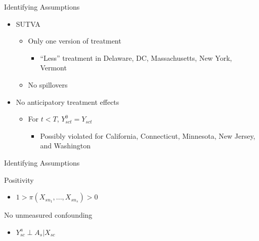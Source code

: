 \documentclass[hyperref={pdfpagelabels=false}]{beamer}
\begin{document}
\begin{frame}{Identifying Assumptions}

\begin{itemize}
    \item SUTVA \bigskip
    \begin{itemize}
        \item Only one version of treatment \bigskip
        \begin{itemize}
            \item ``Less'' treatment in Delaware, DC, Massachusetts, New York, Vermont \bigskip
        \end{itemize}
        \item No spillovers \bigskip
    \end{itemize}
    \item No anticipatory treatment effects \bigskip
    \begin{itemize}
        \item For $t < T$, $Y_{sct}^0 = Y_{sct}$ \bigskip
        \begin{itemize}
            \item Possibly violated for California, Connecticut, Minnesota, New Jersey, and Washington
        \end{itemize}
    \end{itemize}
\end{itemize}

\end{frame}

\begin{frame}{Identifying Assumptions}
    \item Positivity \bigskip
    \begin{itemize}
        \item $1 > \pi(X_{sn_1}, ..., X_{sn_s}) > 0$ \bigskip
    \end{itemize}
    \item No unmeasured confounding \bigskip
    \begin{itemize}
        \item $Y^a_{sc} \perp A_s | X_{sc}$ \bigskip 
    \end{itemize}
\end{frame}
\end{document}
